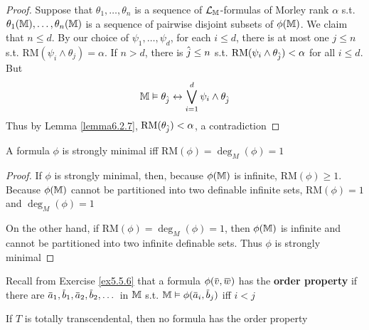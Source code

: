 \documentclass[11pt]{article}
\def \RM {\text{RM}}
\begin{document}
\begin{proof}
Suppose that \(\theta_1,\dots,\theta_n\) is a sequence of \(\mathcal{L}_{\mathbb{M}}\)-formulas of Morley rank \(\alpha\)
s.t. \(\theta_1(\mathbb{M}),\dots,\theta_n(\mathbb{M})\) is a sequence of pairwise disjoint subsets of \(\phi(\mathbb{M})\). We claim
that \(n\le d\). By our choice of \(\psi_1,\dots,\psi_d\), for each \(i\le d\), there is at most one \(j\le n\)
s.t. \(\RM(\psi_i\wedge\theta_j)=\alpha\).  If \(n>d\), there is \(\hat{j}\le n\) s.t. \(\RM(\psi_i\wedge\theta_{\hatj})<\alpha\) for
all \(i\le d\). But
\begin{equation*}
\mathbb{M}\vDash\theta_{\hat{j}}\leftrightarrow\bigvee_{i=1}^d\psi_i\wedge\theta_{\hat{j}}
\end{equation*}
Thus by Lemma \ref{lemma6.2.7}, \(\RM(\theta_{\hatj})<\alpha\), a contradiction
\end{proof}

\begin{corollary}[]
A formula \(\phi\) is strongly minimal iff \(\RM(\phi)=\deg_M(\phi)=1\)
\end{corollary}

\begin{proof}
If \(\phi\) is strongly minimal, then, because \(\phi(\mathbb{M})\) is infinite, \(\RM(\phi)\ge 1\). Because \(\phi(\mathbb{M})\)
cannot be partitioned into two definable infinite sets, \(\RM(\phi)=1\) and \(\deg_M(\phi)=1\)

On the other hand, if \(\RM(\phi)=\deg_M(\phi)=1\), then \(\phi(\mathbb{M})\) is infinite and cannot be
partitioned into two infinite definable sets. Thus \(\phi\) is strongly minimal
\end{proof}

Recall from Exercise \ref{ex5.5.6} that a formula \(\phi(\barv,\barw)\) has the \textbf{order property} if
there are \(\bara_1,\barb_1,\bara_2,\barb_2,\dots\) in \(\mathbb{M}\) s.t. \(\M\vDash\phi(\bara_i,\barb_j)\) iff \(i<j\)

\begin{proposition}[]
If \(T\) is totally transcendental, then no formula has the order property
\end{proposition}
\end{document}
